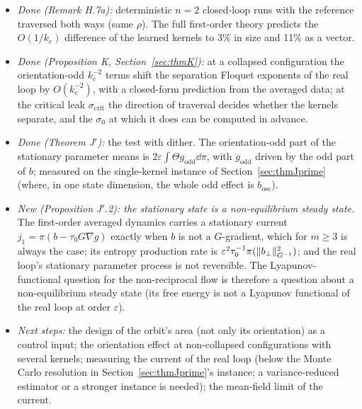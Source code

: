 \begin{enumerate}[label=\arabic*.,leftmargin=*]
\begin{itemize}
    \item \emph{Done (Remark H.7a):} deterministic $n=2$ closed-loop runs with the reference traversed both ways
      (same $\rho$). The full first-order theory predicts the $O(1/k_e)$ difference of the learned kernels to 3\% in
      size and 11\% as a vector.
    \item \emph{Done (Proposition K, Section~\ref{sec:thmK}):} at a collapsed configuration the orientation-odd
      $k_e^{-2}$ terms shift the separation Floquet exponents of the real loop by $O(k_e^{-2})$, with a closed-form
      prediction from the averaged data; at the critical leak $\sigma_{\mathrm{crit}}$ the direction of traversal
      decides whether the kernels separate, and the $\sigma_0$ at which it does can be computed in advance.
    \item \emph{Done (Theorem J$'$):} the test with dither. The orientation-odd part of the stationary parameter
      means is $2\varepsilon\int\Theta g_{\mathrm{odd}}\dd\pi$, with $g_{\mathrm{odd}}$ driven by the odd part of
      $b$; measured on the single-kernel instance of Section~\ref{sec:thmJprime} (where, in one state dimension, the
      whole odd effect is $b_{\mathrm{osc}}$).
    \item \emph{New (Proposition J$'$.2): the stationary state is a non-equilibrium steady state.} The first-order
      averaged dynamics carries a stationary current $j_1 = \pi(b - \tau_0G\nabla g)$ exactly when $b$ is not a
      $G$-gradient, which for $m\ge3$ is always the case; its entropy production rate is
      $\varepsilon^2\tau_0^{-1}\pi(\lVert b_\perp\rVert^2_{G^{-1}})$; and the real loop's stationary parameter process is
      not reversible. The Lyapunov-functional question for the non-reciprocal flow is therefore a question about a
      non-equilibrium steady state (its free energy is not a Lyapunov functional of the real loop at order
      $\varepsilon$).
    \item \emph{Next steps:} the design of the orbit's area (not only its orientation) as a control input; the
      orientation effect at non-collapsed configurations with several kernels; measuring the current of the real loop
      (below the Monte Carlo resolution in Section~\ref{sec:thmJprime}'s instance; a variance-reduced estimator or a
      stronger instance is needed); the mean-field limit of the current.
  \end{itemize}


\end{enumerate}

